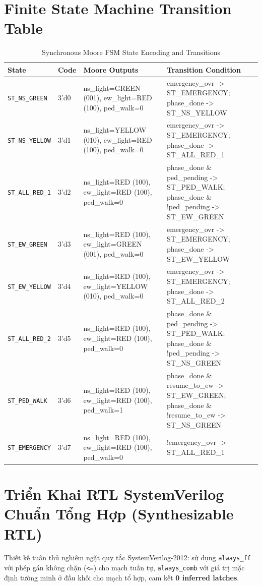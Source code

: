 \documentclass[11pt,a4paper]{article}
\begin{document}
\section{Finite State Machine Transition Table}
\begin{table}[H]
    \centering
    \small
    \caption{Synchronous Moore FSM State Encoding and Transitions}
    \begin{tabularx}{\textwidth}{@{}llXX@{}}
        \toprule
        \textbf{State} & \textbf{Code} & \textbf{Moore Outputs} & \textbf{Transition Condition} \\
        \midrule
        \texttt{ST\_NS\_GREEN} & 3'd0 & ns\_light=GREEN (001), ew\_light=RED (100), ped\_walk=0 & emergency\_ovr -> ST\_EMERGENCY; phase\_done -> ST\_NS\_YELLOW \\
        \texttt{ST\_NS\_YELLOW} & 3'd1 & ns\_light=YELLOW (010), ew\_light=RED (100), ped\_walk=0 & emergency\_ovr -> ST\_EMERGENCY; phase\_done -> ST\_ALL\_RED\_1 \\
        \texttt{ST\_ALL\_RED\_1} & 3'd2 & ns\_light=RED (100), ew\_light=RED (100), ped\_walk=0 & phase\_done \& ped\_pending -> ST\_PED\_WALK; phase\_done \& !ped\_pending -> ST\_EW\_GREEN \\
        \texttt{ST\_EW\_GREEN} & 3'd3 & ns\_light=RED (100), ew\_light=GREEN (001), ped\_walk=0 & emergency\_ovr -> ST\_EMERGENCY; phase\_done -> ST\_EW\_YELLOW \\
        \texttt{ST\_EW\_YELLOW} & 3'd4 & ns\_light=RED (100), ew\_light=YELLOW (010), ped\_walk=0 & emergency\_ovr -> ST\_EMERGENCY; phase\_done -> ST\_ALL\_RED\_2 \\
        \texttt{ST\_ALL\_RED\_2} & 3'd5 & ns\_light=RED (100), ew\_light=RED (100), ped\_walk=0 & phase\_done \& ped\_pending -> ST\_PED\_WALK; phase\_done \& !ped\_pending -> ST\_NS\_GREEN \\
        \texttt{ST\_PED\_WALK} & 3'd6 & ns\_light=RED (100), ew\_light=RED (100), ped\_walk=1 & phase\_done \& resume\_to\_ew -> ST\_EW\_GREEN; phase\_done \& !resume\_to\_ew -> ST\_NS\_GREEN \\
        \texttt{ST\_EMERGENCY} & 3'd7 & ns\_light=RED (100), ew\_light=RED (100), ped\_walk=0 & !emergency\_ovr -> ST\_ALL\_RED\_1 \\
        \bottomrule
    \end{tabularx}
\end{table}


\section{Triển Khai RTL SystemVerilog Chuẩn Tổng Hợp (Synthesizable RTL)}
Thiết kế tuân thủ nghiêm ngặt quy tắc SystemVerilog-2012: sử dụng \texttt{always\_ff} với phép gán không chặn (\texttt{<=}) cho mạch tuần tự, \texttt{always\_comb} với giá trị mặc định tường minh ở đầu khối cho mạch tổ hợp, cam kết \textbf{0 inferred latches}.
\end{document}
